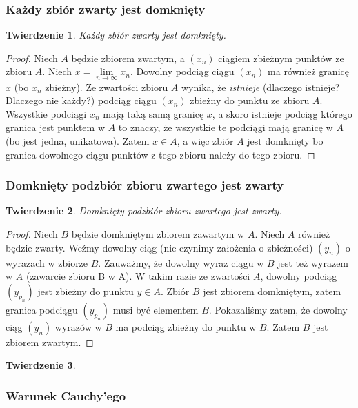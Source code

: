 \documentclass{article}
\newtheorem*{theorem}{Twierdzenie}
\begin{document}
\subsubsection{Każdy zbiór zwarty jest domknięty}
\begin{theorem}
    Każdy zbiór zwarty jest domknięty.
\end{theorem}
\begin{proof}
    Niech \(A\) będzie zbiorem zwartym, a \((x_n)\) ciągiem zbieżnym punktów ze zbioru \(A\).
    Niech \(x = \lim\limits_{n \to \infty} x_n\). Dowolny podciąg ciągu \((x_n)\) ma również granicę \(x\) (bo \(x_n\) zbieżny).
    Ze zwartości zbioru \(A\) wynika, że \emph{istnieje} (dlaczego istnieje? Dlaczego nie każdy?) podciąg ciągu \((x_n)\)
    zbieżny do punktu ze zbioru \(A\). Wszystkie podciągi \(x_n\) mają taką samą granicę \(x\), a skoro istnieje podciąg
    którego granica jest punktem w \(A\) to znaczy, że wszystkie te podciągi mają granicę w \(A\) (bo jest jedna, unikatowa).
    Zatem \(x \in A\), a więc zbiór \(A\) jest domknięty bo granica dowolnego ciągu punktów z tego zbioru należy do tego zbioru. 
\end{proof}
\subsubsection{Domknięty podzbiór zbioru zwartego jest zwarty}
\begin{theorem}
    Domknięty podzbiór zbioru zwartego jest zwarty.
\end{theorem}
\begin{proof} 
    Niech \(B\) będzie domkniętym zbiorem zawartym w \(A\). Niech \(A\) również będzie zwarty. Weźmy dowolny ciąg (nie
    czynimy założenia o zbieżności) \((y_n)\) o wyrazach w zbiorze \(B\). Zauważmy, że dowolny wyraz ciągu w 
    \(B\) jest też wyrazem w \(A\) (zawarcie zbioru B w A). W takim razie ze zwartości \(A\), dowolny podciąg \((y_{p_n})\) jest 
    zbieżny do punktu \(y \in A\). Zbiór \(B\) jest zbiorem domkniętym, zatem granica podciągu \((y_{p_n})\)
    musi być elementem \(B\). Pokazaliśmy zatem, że dowolny ciąg \((y_n)\) wyrazów w \(B\) ma podciąg zbieżny
    do punktu w \(B\). Zatem \(B\) jest zbiorem zwartym.
\end{proof}
\begin{theorem}
    
\end{theorem}

\subsubsection{Warunek Cauchy'ego}
\end{document}
